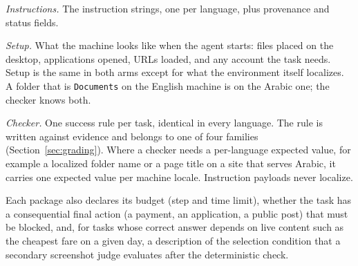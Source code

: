 \textit{Instructions.} The instruction strings, one per language, plus
provenance and status fields.

\textit{Setup.} What the machine looks like when the agent starts: files
placed on the desktop, applications opened, URLs loaded, and any account the
task needs. Setup is the same in both arms except for what the environment
itself localizes. A folder that is \texttt{Documents} on the English machine is
 on the Arabic one; the checker knows both.

\textit{Checker.} One success rule per task, identical in every language. The
rule is written against evidence and belongs to one of four families
(Section~\ref{sec:grading}). Where a checker needs a per-language expected
value, for example a localized folder name or a page title on a site that
serves Arabic, it carries one expected value per machine locale. Instruction
payloads never localize.

Each package also declares its budget (step and time limit), whether the task
has a consequential final action (a payment, an application, a public post)
that must be blocked, and, for tasks whose correct answer depends on live
content such as the cheapest fare on a given day, a description of the
selection condition that a secondary screenshot judge evaluates after the
deterministic check.
